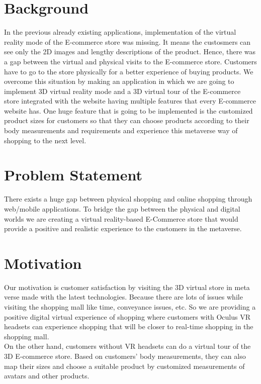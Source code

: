 \section{Background}
\justifying
In the previous already existing applications, implementation of the virtual reality mode of the E-commerce store was missing. It means the custosmers can see only the 2D images and lengthy descriptions of the product. Hence, there was a gap between the virtual and physical visits to the E-commerce store. Customers have to go to the store physically for a better experience of buying products. We overcome this situation by making an application in which we are going to implement 3D virtual reality mode and a 3D virtual tour of the E-commerce store integrated with the website having multiple features that every E-commerce website has. One huge feature that is going to be implemented is the customized product sizes for customers so that they can choose products according to their body measurements and requirements and experience this metaverse way of shopping to the next level.
\section{Problem Statement}
\justifying
There exists a huge gap between physical shopping and online shopping through web/mobile applications. To bridge the gap between the physical and digital worlds we are creating a virtual reality-based E-Commerce store that would provide a positive and realistic experience to the customers in the metaverse.
\section{Motivation}
\justifying
Our motivation is customer satisfaction by visiting the 3D virtual store in meta verse made with the latest technologies. Because there are lots of issues while visiting the shopping mall like time, conveyance issues, etc. So we are providing a positive digital virtual experience of shopping where customers with Oculus VR headsets can experience shopping that will be closer to real-time shopping in the shopping mall.\\
On the other hand, customers without VR headsets can do a virtual tour of the 3D E-commerce store. Based on customers’ body measurements, they can also map their sizes and choose a suitable product by customized measurements of avatars and other products.
